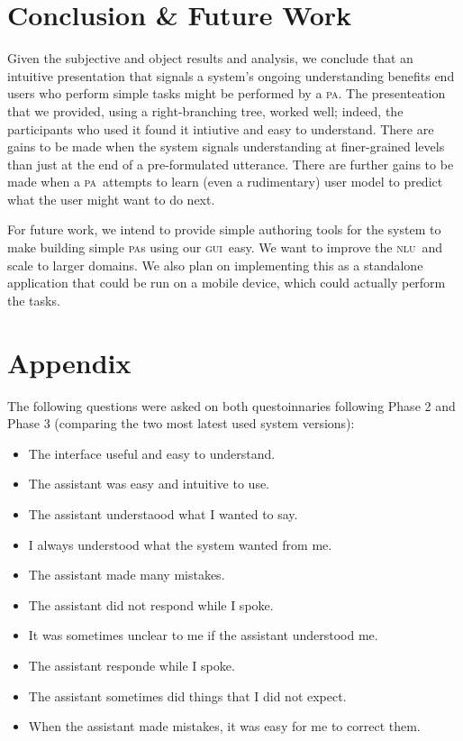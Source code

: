 \documentclass[11pt]{article}
\newcommand{\nlu}[0]{\textsc{nlu}}
\newcommand{\ui}[0]{\textsc{gui}}
\newcommand{\pa}[0]{\textsc{pa}}
\begin{document}
\section{Conclusion \& Future Work}

Given the subjective and object results and analysis, we conclude that an intuitive presentation that signals a system's ongoing understanding benefits end users who perform simple tasks might be performed by a \pa. The presenteation that we provided, using a right-branching tree, worked well; indeed, the participants who used it found it intiutive and easy to understand. There are gains to be made when the system signals understanding at finer-grained levels than just at the end of a pre-formulated utterance. There are further gains to be made when a \pa\ attempts to learn (even a rudimentary) user model to predict what the user might want to do next. 

For future work, we intend to provide simple authoring tools for the system to make building simple \pa s using our \ui\ easy. We want to improve the \nlu\ and scale to larger domains. We also plan on implementing this as a standalone application that could be run on a mobile device, which could actually perform the tasks.


\section*{Appendix}

The following questions were asked on both questoinnaries following Phase 2 and Phase 3 (comparing the two most latest used system versions):
\begin{itemize}
 \item The interface useful and easy to understand.
 \item The assistant was easy and intuitive to use.
 \item The assistant understaood what I wanted to say.
 \item I always understood what the system wanted from me. 
 \item The assistant made many mistakes. 
 \item The assistant did not respond while I spoke.
 \item It was sometimes unclear to me if the assistant understood me. 
 \item The assistant responde while I spoke. 
 \item The assistant sometimes did things that I did not expect.
 \item When the assistant made mistakes, it was easy for me to correct them. 
\end{itemize}
\end{document}
